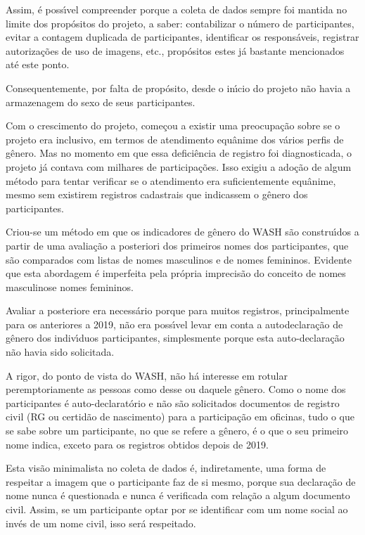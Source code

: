\documentclass[
12pt,		%
openright,	%
twoside,  %
a4paper,			%
chapter=TITLE,		%
english,			%
french,				%
spanish,			%
brazil				%
]{USPSC-classe/USPSC}
\begin{document}
Assim, \'e poss\'{\i}vel compreender porque a coleta de dados sempre foi mantida no limite dos prop\'ositos do projeto, a saber: contabilizar o n\'umero de participantes, evitar a contagem duplicada de participantes, identificar os respons\'aveis, registrar autoriza\c{c}\~oes de uso de imagens, etc., prop\'ositos estes j\'a bastante mencionados at\'e este ponto.


Consequentemente, por falta de prop\'osito, desde o in\'{\i}cio do projeto n\~ao havia a armazenagem do sexo de seus participantes.


Com o crescimento do projeto, come\c{c}ou a existir uma preocupa\c{c}\~ao sobre se o projeto era inclusivo, em termos de atendimento equ\^anime dos v\'arios perfis de g\^enero. Mas no momento em que essa defici\^encia de registro foi diagnosticada, o projeto j\'a contava com milhares de participa\c{c}\~oes. Isso exigiu a ado\c{c}\~ao de algum m\'etodo para tentar verificar se o atendimento era suficientemente equ\^anime, mesmo sem existirem registros cadastrais que indicassem o g\^enero dos participantes.


Criou-se um m\'etodo em que os indicadores de g\^enero do WASH s\~ao constru\'{\i}dos a partir de uma avalia\c{c}\~ao a posteriori dos primeiros nomes dos participantes, que s\~ao comparados com listas de nomes masculinos e de nomes femininos. Evidente que esta abordagem \'e imperfeita pela pr\'opria imprecis\~ao do conceito de \textquotedbl nomes masculinos\textquotedbl  e \textquotedbl nomes femininos\textquotedbl .


Avaliar a posteriore era necess\'ario porque para muitos registros, principalmente para os anteriores a 2019, n\~ao era poss\'{\i}vel levar em conta a autodeclara\c{c}\~ao de g\^enero dos indiv\'{\i}duos participantes, simplesmente porque esta auto-declara\c{c}\~ao n\~ao havia sido solicitada.


A rigor, do ponto de vista do WASH, n\~ao h\'a interesse em rotular peremptoriamente as pessoas como desse ou daquele g\^enero. Como o nome dos participantes \'e auto-declarat\'orio e n\~ao s\~ao solicitados documentos de registro civil (RG ou certid\~ao de nascimento) para a participa\c{c}\~ao em oficinas, tudo o que se sabe sobre um participante, no que se refere a g\^enero, \'e o que o seu primeiro nome indica, exceto para os registros obtidos depois de 2019.


Esta vis\~ao minimalista no coleta de dados \'e, indiretamente, uma forma de respeitar a imagem que o participante faz de si mesmo, porque sua declara\c{c}\~ao de nome nunca \'e questionada e nunca \'e verificada com rela\c{c}\~ao a algum documento civil. Assim, se um participante optar por se identificar com um nome social ao inv\'es de um nome civil, isso ser\'a respeitado.
\end{document}
